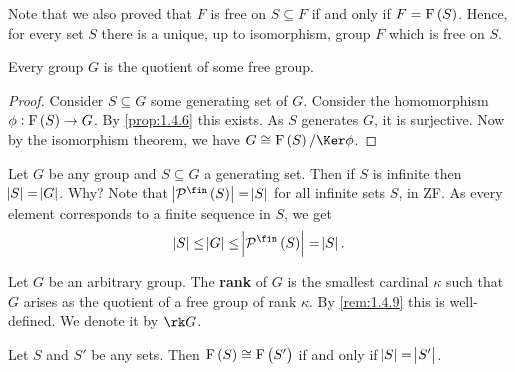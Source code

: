 
\begin{remark}
Note that we also proved that $ F $ is free on $ S \subseteq F $ if and only if $ F = \F\br{S} $. Hence, for every set $ S $ there is a unique, up to isomorphism, group $ F $ which is free on $ S $.
\end{remark}

\begin{lemma}
Every group $ G $ is the quotient of some free group.
\end{lemma}

\begin{proof}
Consider $ S \subseteq G $ some generating set of $ G $. Consider the homomorphism $ \phi : \F\br{S} \to G $. By \ref{prop:1.4.6} this exists. As $ S $ generates $ G $, it is surjective. Now by the isomorphism theorem, we have $ G \cong \F\br{S} / \Ker \phi $.
\end{proof}

\begin{remark}
\label{rem:1.4.9}
Let $ G $ be any group and $ S \subseteq G $ a generating set. Then if $ S $ is infinite then $ \abs{S} = \abs{G} $. Why? Note that $ \abs{\PPP^{\fin}\br{S}} = \abs{S} $ for all infinite sets $ S $, in ZF. As every element corresponds to a finite sequence in $ S $, we get
$$ \abs{S} \le \abs{G} \le \abs{\PPP^{\fin}\br{S}} = \abs{S}. $$
\end{remark}

\begin{definition}
Let $ G $ be an arbitrary group. The \textbf{rank} of $ G $ is the smallest cardinal $ \kappa $ such that $ G $ arises as the quotient of a free group of rank $ \kappa $. By \ref{rem:1.4.9} this is well-defined. We denote it by $ \rk G $.
\end{definition}

\begin{lemma}
Let $ S $ and $ S' $ be any sets. Then $ \F\br{S} \cong \F\br{S'} $ if and only if $ \abs{S} = \abs{S'} $.
\end{lemma}

